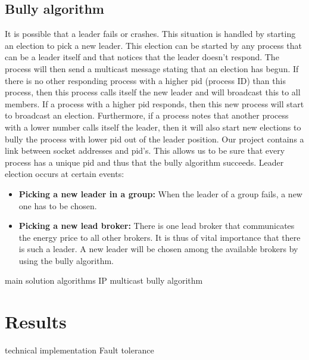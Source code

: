 \documentclass[10pt]{article} %
\begin{document}
\subsection{Bully algorithm}
It is possible that a leader fails or crashes. This situation is handled by starting an election to pick a new leader. This election can be started by any process that can be a leader itself and that notices that the leader doesn't respond. The process will then send a multicast message stating that an election has begun. If there is no other responding process with a higher pid (process ID) than this process, then this process calls itself the new leader and will broadcast this to all members. If a process with a higher pid responds, then this new process will start to broadcast an election. Furthermore, if a process notes that another process with a lower number calls itself the leader, then it will also start new elections to bully the process with lower pid out of the leader position. Our project contains a link between socket addresses and pid's. This allows us to be sure that every process has a unique pid and thus that the bully algorithm succeeds. Leader election occurs at certain events:
\begin{itemize}
 \item \textbf{Picking a new leader in a group:} When the leader of a group fails, a new one has to be chosen.\\
 \item \textbf{Picking a new lead broker:} There is one lead broker that communicates the energy price to all other brokers. It is thus of vital importance that there is such a leader. A new leader will be chosen among the available brokers by using the bully algorithm.\\
\end{itemize}




main solution
algorithms
IP multicast
bully algorithm


\section{Results}

technical implementation
Fault tolerance

 
\end{document}
